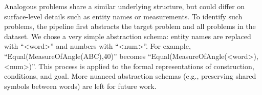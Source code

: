 Analogous problems share a similar underlying structure, but could differ on surface-level details such as entity names or measurements.
%
To identify such problems, the pipeline first abstracts the target problem and all problems in the dataset. %
We chose a very simple abstraction schema:
 entity names are replaced with ``<word>'' and numbers with ``<num>''.  
 For example,  %
 ``Equal(MeasureOfAngle(ABC),40)'' becomes ``Equal(MeasureOfAngle(<word>), <num>)''. This process is applied to the formal representations of construction, conditions, and goal. More nuanced abstraction schemas (e.g., preserving shared symbols between words) are left for future work.






 





